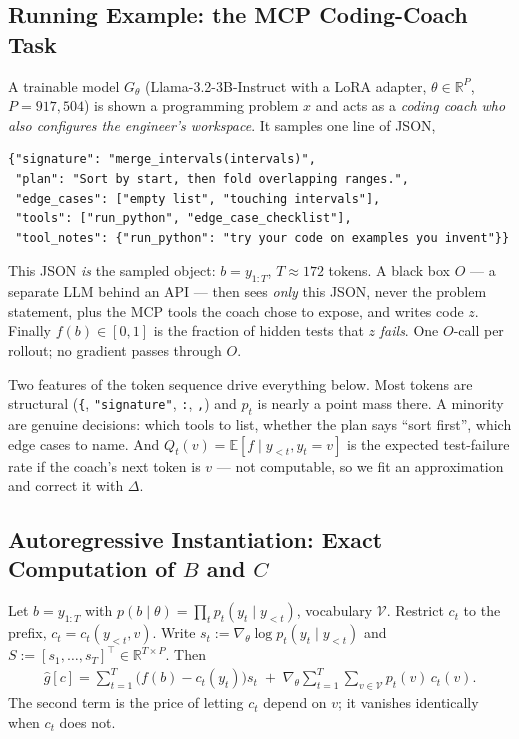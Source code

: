 \documentclass{article}
\theoremstyle{plain}
\theoremstyle{definition}
\newcommand{\E}{\mathbb{E}}
\begin{document}
\subsection{Running Example: the MCP Coding-Coach Task}
\label{sec:mcp}

A trainable model $G_\theta$ (Llama-3.2-3B-Instruct with a LoRA adapter, $\theta\in\mathbb{R}^P$,
$P=917{,}504$) is shown a programming problem $x$ and acts as a \emph{coding coach who also
configures the engineer's workspace}. It samples one line of JSON,
\begin{verbatim}
{"signature": "merge_intervals(intervals)",
 "plan": "Sort by start, then fold overlapping ranges.",
 "edge_cases": ["empty list", "touching intervals"],
 "tools": ["run_python", "edge_case_checklist"],
 "tool_notes": {"run_python": "try your code on examples you invent"}}
\end{verbatim}
This JSON \emph{is} the sampled object: $b=y_{1:T}$, $T\approx172$ tokens. A black box $O$ --- a
separate LLM behind an API --- then sees \emph{only} this JSON, never the problem statement, plus the
MCP tools the coach chose to expose, and writes code $z$. Finally $f(b)\in[0,1]$ is the fraction of
hidden tests that $z$ \emph{fails}. One $O$-call per rollout; no gradient passes through $O$.

Two features of the token sequence drive everything below. Most tokens are structural
(\texttt{\{}, \texttt{"signature"}, \texttt{:}, \texttt{,}) and $p_t$ is nearly a point mass there.
A minority are genuine decisions: which tools to list, whether the plan says ``sort first'', which
edge cases to name. And $Q_t(v)=\E[f\mid y_{<t},y_t=v]$ is the expected test-failure rate if the
coach's next token is $v$ --- not computable, so we fit an approximation and correct it with $\Delta$.

\subsection{Autoregressive Instantiation: Exact Computation of $B$ and $C$}

Let $b=y_{1:T}$ with $p(b\mid\theta)=\prod_t p_t(y_t\mid y_{<t})$, vocabulary $\mathcal{V}$. Restrict
$c_t$ to the prefix, $c_t=c_t(y_{<t},v)$. Write $s_t:=\nabla_\theta\log p_t(y_t\mid y_{<t})$ and
$S:=[s_1,\dots,s_T]^\top\in\mathbb{R}^{T\times P}$. Then
\begin{align}
\hat g[c]=\sum_{t=1}^T\big(f(b)-c_t(y_t)\big)s_t
\;+\;\nabla_\theta\sum_{t=1}^T\sum_{v\in\mathcal{V}}p_t(v)\,c_t(v).
\label{eq:ghat-ar}
\end{align}
The second term is the price of letting $c_t$ depend on $v$; it vanishes identically when $c_t$ does not.
\end{document}
